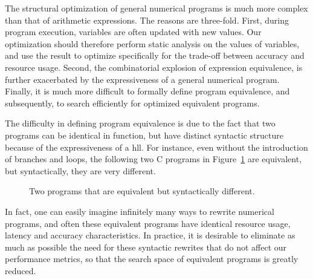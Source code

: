 The structural optimization of general numerical programs is much more complex
than that of arithmetic expressions.  The reasons are three-fold.  First,
during program execution, variables are often updated with new values.  Our
optimization should therefore perform static analysis on the values of
variables, and use the result to optimize specifically for the trade-off
between accuracy and resource usage.  Second, the combinatorial explosion of
expression equivalence, is further exacerbated by the expressiveness of a
general numerical program.  Finally, it is much more difficult to formally
define program equivalence, and subsequently, to search efficiently for
optimized equivalent programs.

The difficulty in defining program equivalence is due to the fact that two
programs can be identical in function, but have distinct syntactic structure
because of the expressiveness of a \gls{hll}\@.  For instance, even without
the introduction of branches and loops, the following two C programs in
Figure~\ref{bg:fig:equiv_progs} are equivalent, but syntactically, they are
very different.
\begin{figure}[ht]
    \centering
     \qquad \qquad
    \caption{%
        Two programs that are equivalent but syntactically different.
    }\label{bg:fig:equiv_progs}
\end{figure}

In fact, one can easily imagine infinitely many ways to rewrite numerical
programs, and often these equivalent programs have identical resource usage,
latency and accuracy characteristics.  In practice, it is desirable to
eliminate as much as possible the need for these syntactic rewrites that do not
affect our performance metrics, so that the search space of equivalent programs
is greatly reduced.

